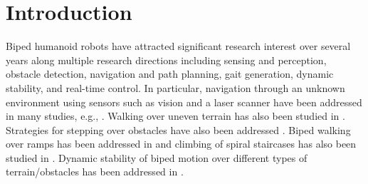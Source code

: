 \documentclass[10pt,conference]{ieeeconf}
\begin{document}
\section{Introduction} 
    \vspace*{-0.03in}
Biped humanoid robots have attracted significant research interest over
several years along multiple research directions including sensing and
perception, obstacle detection, navigation and path planning, gait generation,
dynamic stability, and real-time control. In particular, 
navigation through an unknown environment using sensors such as vision and a
laser scanner have been addressed in many studies, e.g.,
\cite{CTS09,YKT11,MCK06,OTK05}. Walking over
uneven terrain has also been studied in \cite{IT10,CKN03,WP10}. Strategies for
stepping over obstacles have also been addressed \cite{VSY06}. Biped walking over
ramps has been addressed in \cite{LAH12} and climbing of spiral staircases has
also been studied in \cite{OGH11}. Dynamic stability of biped motion over
different types of terrain/obstacles has been addressed in \cite{WGC07,CDG08}.
\end{document}
